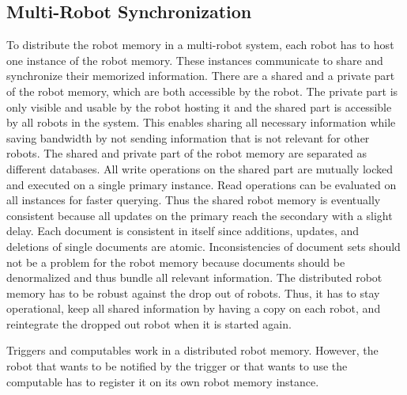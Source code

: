 \subsection{Multi-Robot Synchronization}
\label{sec:synchronization}
To distribute the robot memory in a multi-robot system,
each robot has to
host one instance of the robot memory. These instances communicate to
share and synchronize their memorized information. There are a shared
and a private part of the robot memory, which are both accessible by
the robot. The private part is only visible and usable by the robot
hosting it and the shared part is accessible by all robots in the
system. This enables sharing all necessary information while saving
bandwidth by not sending information that is not relevant for other
robots. The shared and private part of the robot memory are separated
as different databases. All write operations on the shared part are
mutually locked and executed on a single primary instance. Read
operations can be evaluated on all instances for faster
querying. Thus the shared robot memory is eventually consistent
because all updates on the primary reach the secondary with a slight delay. Each
document is consistent in itself since additions, updates, and
deletions of single documents are atomic. Inconsistencies of document
sets should not be a problem for the robot memory because documents
should be denormalized and thus bundle all relevant information.
The distributed robot memory has to be robust against the
drop out of robots. Thus, it has to stay operational, keep all shared
information by having a copy on each robot, and reintegrate the dropped
out robot when it is started again.

Triggers and computables work in a distributed robot memory. However,
the robot that wants to be notified by the trigger or that wants to
use the computable has to register it on its own robot memory instance.

